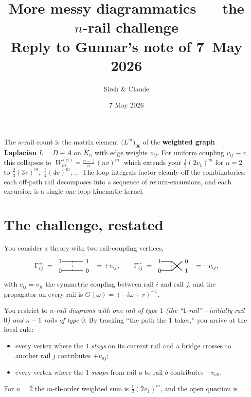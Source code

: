 \documentclass[11pt,a4paper]{article}
\title{\vspace{-1.2cm}More messy diagrammatics --- the $n$-rail challenge\\[2pt]
{\large Reply to Gunnar's note of 7~May 2026}}
\author{Sirsh \& Claude}
\date{7 May 2026}
\newcommand{\hl}[1]{\colorbox{gunnaryellow}{$#1$}}
\begin{document}
\maketitle

\vspace{-1em}
\begin{commentbox}[title=One-line takeaway]
The $n$-rail count is the matrix element $\big(L^{m}\big)_{00}$ of the
\textbf{weighted graph Laplacian} $L=D-A$ on $K_n$ with edge weights $v_{ij}$.
For uniform coupling $v_{ij}\!\equiv\!v$ this collapses to
$\boxed{\;W^{(n)}_m = \tfrac{n-1}{n}\,(nv)^m\;}$ which extends your
$\tfrac12(2v_1)^m$ for $n{=}2$ to $\tfrac23(3v)^m,\;\tfrac34(4v)^m,\dots$\
The loop integrals factor cleanly off the combinatorics: each off-path rail
decomposes into a sequence of return-excursions, and each excursion is a
single one-loop kinematic kernel.
\end{commentbox}

\section{The challenge, restated}

You consider a theory with two rail-coupling vertices,
\[
\Gamma^{+}_{ij}\;=\;
\begin{tikzpicture}[baseline=-0.6ex,scale=0.55]
  \draw[thick] (-1,0.45)--(1,0.45) node[right]{\small$1$};
  \node at (-1.15,0.45){\small$1$};
  \draw[thick] (-1,-0.45)--(1,-0.45) node[right]{\small$0$};
  \node at (-1.15,-0.45){\small$0$};
  \draw[dashed] (0,0.45)--(0,-0.45);
\end{tikzpicture}\;\;= +v_{ij},
\qquad
\Gamma^{-}_{ij}\;=\;
\begin{tikzpicture}[baseline=-0.6ex,scale=0.55]
  \draw[thick] (-1,0.45)--(0,0.45)--(1,-0.45) node[right]{\small$1$};
  \node at (-1.15,0.45){\small$1$};
  \draw[thick] (-1,-0.45)--(0,-0.45)--(1,0.45) node[right]{\small$0$};
  \node at (-1.15,-0.45){\small$0$};
  \draw[dashed] (0,0.45)--(0,-0.45);
\end{tikzpicture}\;\;= -v_{ij},
\]
with $v_{ij}=v_{ji}$ the symmetric coupling between rail $i$ and rail $j$, and
the propagator on every rail is $G(\omega)=(-i\omega+r)^{-1}$.

You restrict to \emph{$n$-rail diagrams with one rail of type $1$ (the
``$1$-rail''---initially rail $0$) and $n-1$ rails of type $0$}. By tracking
``the path the $1$ takes,'' you arrive at the local rule:
\begin{itemize}[leftmargin=2em,itemsep=1pt]
  \item every vertex where the $1$ \emph{stays} on its current rail and a
        bridge crosses to another rail $j$ contributes \hl{+v_{aj}};
  \item every vertex where the $1$ \emph{swaps} from rail $a$ to rail $b$
        contributes \hl{-v_{ab}}.
\end{itemize}
For $n=2$ the $m$-th-order weighted sum is \hl{\tfrac12(2v_1)^m}, and the open
question is
\end{document}
